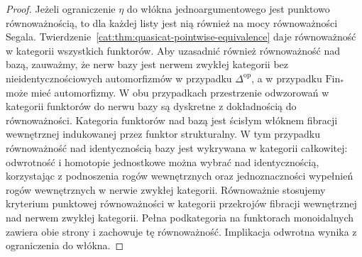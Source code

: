 \begin{proof}
Jeżeli ograniczenie $\eta$ do włókna jednoargumentowego jest punktowo równoważnością, to dla każdej listy jest nią również na mocy równoważności Segala. Twierdzenie~\ref{cat:thm:quasicat-pointwise-equivalence} daje równoważność w kategorii wszystkich funktorów. Aby uzasadnić również równoważność nad bazą, zauważmy, że nerw bazy jest nerwem zwykłej kategorii bez nieidentycznościowych automorfizmów w przypadku $\Delta^{\mathrm{op}}$, a w przypadku $\mathrm{Fin}_*$ może mieć automorfizmy. W obu przypadkach przestrzenie odwzorowań w kategorii funktorów do nerwu bazy są dyskretne z dokładnością do równoważności. Kategoria funktorów nad bazą jest ścisłym włóknem fibracji wewnętrznej indukowanej przez funktor strukturalny. W tym przypadku równoważność nad identycznością bazy jest wykrywana w kategorii całkowitej: odwrotność i homotopie jednostkowe można wybrać nad identycznością, korzystając z podnoszenia rogów wewnętrznych oraz jednoznaczności wypełnień rogów wewnętrznych w nerwie zwykłej kategorii. Równoważnie stosujemy kryterium punktowej równoważności w kategorii przekrojów fibracji wewnętrznej nad nerwem zwykłej kategorii. Pełna podkategoria na funktorach monoidalnych zawiera obie strony i zachowuje tę równoważność. Implikacja odwrotna wynika z ograniczenia do włókna.
\end{proof}

